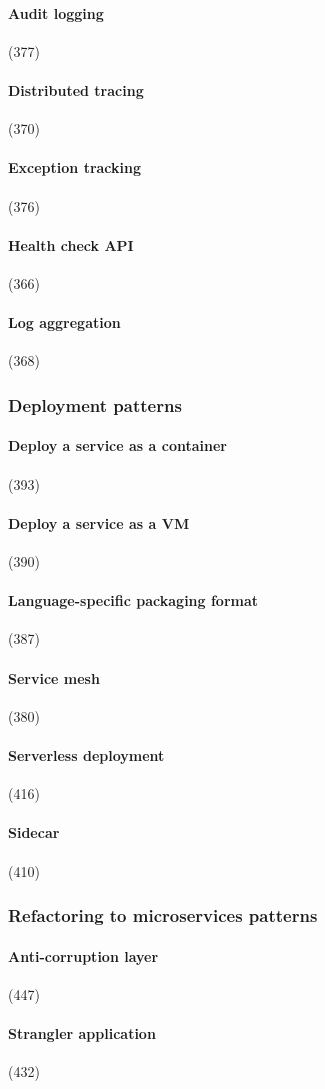 \paragraph{Audit logging} (377)
\paragraph{Distributed tracing} (370)
\paragraph{Exception tracking} (376)
\paragraph{Health check API} (366)
\paragraph{Log aggregation} (368)

\subsubsection{Deployment patterns}
\paragraph{Deploy a service as a container} (393)
\paragraph{Deploy a service as a VM} (390)
\paragraph{Language-specific packaging format} (387)
\paragraph{Service mesh} (380)
\paragraph{Serverless deployment} (416)
\paragraph{Sidecar} (410)

\subsubsection{Refactoring to microservices patterns}
\paragraph{Anti-corruption layer} (447)
\paragraph{Strangler application} (432)
